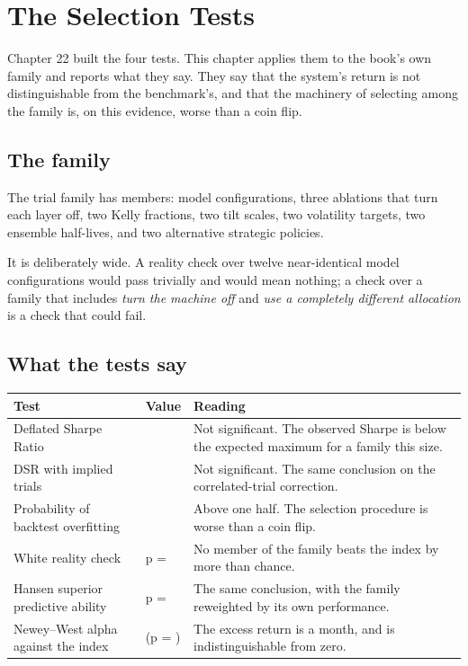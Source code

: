 
\chapter{The Selection Tests}
\label{ch:selection-results}

Chapter 22 built the four tests. This chapter applies them to the book's
own family and reports what they say. They say that the system's return
is not distinguishable from the benchmark's, and that the machinery of
selecting among the family is, on this evidence, worse than a coin flip.

\section{The family}

The trial family has \numFamilySize{} members: \numModelConfigs{} model
configurations, three ablations that turn each layer off, two Kelly
fractions, two tilt scales, two volatility targets, two ensemble
half-lives, and two alternative strategic policies.

It is deliberately wide. A reality check over twelve near-identical
model configurations would pass trivially and would mean nothing; a check
over a family that includes \emph{turn the machine off} and \emph{use a
completely different allocation} is a check that could fail.

\section{What the tests say}

\begin{center}
\begin{tabular}{@{}P{1.72in}P{0.72in}P{2.30in}@{}}
\toprule
Test & Value & Reading \\
\midrule
Deflated Sharpe Ratio       & \numDSR{} & Not significant. The observed Sharpe is below the expected maximum for a family this size. \\
DSR with implied trials     & \numDSRImplied{} & Not significant. The same conclusion on the correlated-trial correction. \\
Probability of backtest overfitting & \numPBO{} & Above one half. The selection procedure is worse than a coin flip. \\
White reality check         & p = \numRCP{} & No member of the family beats the index by more than chance. \\
Hansen superior predictive ability & p = \numSPAP{} & The same conclusion, with the family reweighted by its own performance. \\
Newey--West alpha against the index & \numAlphaT{} (p = \numAlphaP{}) & The excess return is \numAlpha{} a month, and is indistinguishable from zero. \\
\bottomrule
\end{tabular}
\end{center}

